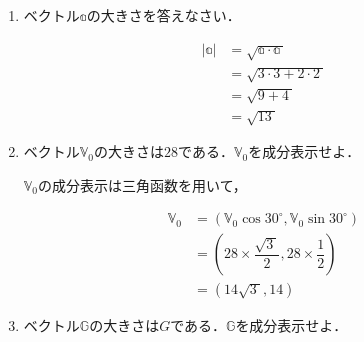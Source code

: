 \documentclass[a4paper,11pt]{ltjsarticle}
\begin{document}
\begin{enumerate}
  \item ベクトル$\mathbb{a}$の大きさを答えなさい．
  
  \begin{equation*}
    \begin{aligned}
      |\mathbb{a}| &= \sqrt{\mathbb{a \cdot a}\ } \\
                    &= \sqrt{3 \cdot 3 + 2 \cdot 2\ } \\
                    &= \sqrt{9+4\ } \\
                    &= \sqrt{13\ }
    \end{aligned}
  \end{equation*}

  \item ベクトル$\mathbb{V}_{0}$の大きさは$28$である．$\mathbb{V}_{0}$を成分表示せよ．
  
  \begin{center}
  \end{center}

\clearpage

$\mathbb{V}_0$の成分表示は三角函数を用いて，

  \begin{equation*}
    \begin{aligned}
      \mathbb{V}_0 &= (\mathbb{V}_0 \cos{30^{\circ}},\mathbb{V}_0 \sin{30^{\circ}}) \\
                    &= \left(28 \times \dfrac{\sqrt{3\ }}{2},28 \times \dfrac{1}{2}\right) \\
                    &= (14 \sqrt{3\ },14)
    \end{aligned}
  \end{equation*}  

  \item ベクトル$\mathbb{G}$の大きさは$G$である．$\mathbb{G}$を成分表示せよ．


\end{enumerate}
\end{document}
